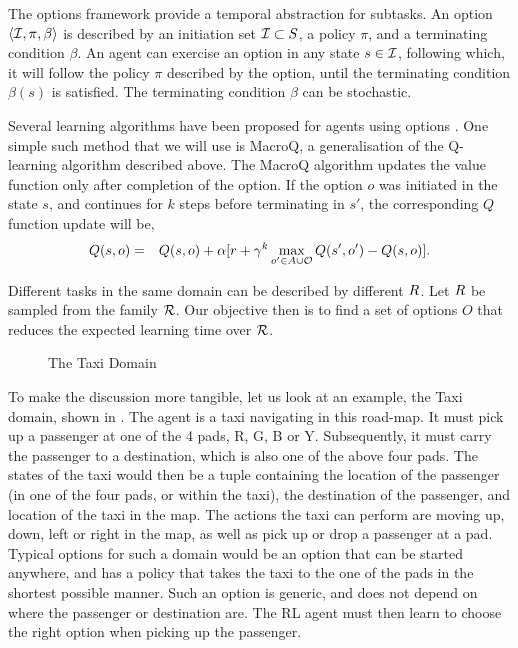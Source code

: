 The options framework provide a temporal abstraction for subtasks. An
option $\langle  \mathcal{I},\pi,\beta \rangle$ is described by an initiation set $\mathcal{I} \subset
S$, a policy $\pi$, and a terminating condition $\beta$.  An agent
can exercise an option in any state $s \in \mathcal{I}$, following which,
it will follow the policy $\pi$ described by the option, until the
terminating condition $\beta(s)$ is satisfied. The terminating condition
$\beta$ can be stochastic.

Several learning algorithms have been proposed for agents using options
\cite{SuttonPrecupSingh1999,BartoMahadevan2003}. One simple such method that
we will use is MacroQ, a generalisation of the Q-learning algorithm
described above. The MacroQ algorithm updates the value function only
after completion of the option. If the option $o$ was initiated in the
state $s$, and continues for $k$ steps before terminating in $s'$, the
corresponding $Q$ function update will be,
\begin{eqnarray*}
    Q(s,o) &=& Q(s,o) + \alpha [ r + \gamma^{k} \max_{o' \in A \cup \mathcal{O}} Q(s',o') - Q(s,o) ].
\end{eqnarray*}

Different tasks in the same domain can be described by different
$R$. Let $R$ be sampled from the family $\mathcal{R}$. Our
objective then is to find a set of options $O$ that reduces the expected
learning time over $\mathcal{R}$.

\begin{example}
  \label{example:taxi}

\begin{figure}[th]
    \centering
    
    \label{fig:taxi-domain}
    \caption{The Taxi Domain}
\end{figure}
To make the discussion more tangible, let us look at an example, the
Taxi domain, shown in . The agent is a taxi
navigating in this road-map. It must pick up a passenger at one of the
4 pads, R, G, B or Y.  Subsequently, it must carry the passenger to a
destination, which is also one of the above four pads. The states of
the taxi would then be a tuple containing the location of the
passenger (in one of the four pads, or within the taxi), the
destination of the passenger, and location of the taxi in the map.
The actions the taxi can perform are moving up, down, left or right in
the map, as well as pick up or drop a passenger at a pad. 
Typical options for such a domain would be an option that can be
started anywhere, and has a policy that takes the taxi to the one of
the pads in the shortest possible manner. Such an option is generic,
and does not depend on where the passenger or destination are. The RL
agent must then learn to choose the right option when picking up the
passenger.
\end{example}

